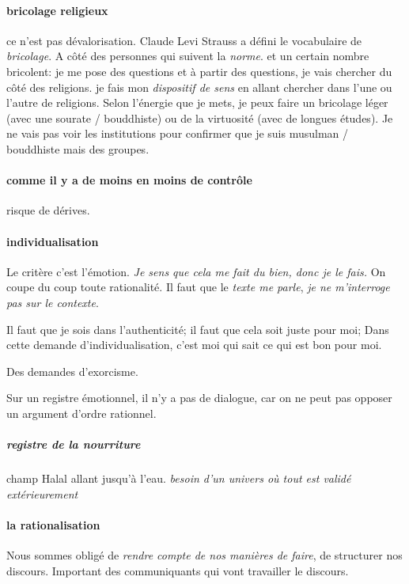 \paragraph{bricolage religieux} ce n'est pas dévalorisation. Claude Levi Strauss a défini le vocabulaire de \textit{bricolage}. A côté des personnes qui suivent la \textit{norme}. et un certain nombre bricolent: je me pose des questions et à partir des questions, je vais chercher du côté des religions. je fais mon \textit{dispositif de sens} en allant chercher dans l'une ou l'autre de religions. Selon l'énergie que je mets, je peux faire un bricolage léger (avec une sourate / bouddhiste) ou de la virtuosité (avec de longues études). Je ne vais pas voir les institutions pour confirmer que je suis musulman / bouddhiste mais des groupes. 

\paragraph{comme il y a de moins en moins de contrôle} risque de dérives. 

\paragraph{individualisation} Le critère c'est l'émotion. \textit{Je sens que cela me fait du bien, donc je le fais. } On coupe du coup toute rationalité. Il faut que le \textit{texte me parle}, \textit{je ne m'interroge pas sur le contexte}.
\begin{Synthesis}
Il faut que je sois dans l'authenticité; il faut que cela soit juste pour moi; Dans cette demande d'individualisation, c'est moi qui sait ce qui est bon pour moi. 
\end{Synthesis}
\begin{Ex}
Des demandes d'exorcisme.
\end{Ex}
Sur un registre émotionnel, il n'y a pas de dialogue, car on ne peut pas opposer un argument d'ordre rationnel.

\subparagraph{registre de la nourriture} champ Halal allant jusqu'à l'eau. \textit{besoin d'un univers où tout est validé extérieurement}

\paragraph{la rationalisation} Nous sommes obligé de \textit{rendre compte de nos manières de faire}, de structurer nos discours. Important des communiquants qui vont travailler le discours. 



